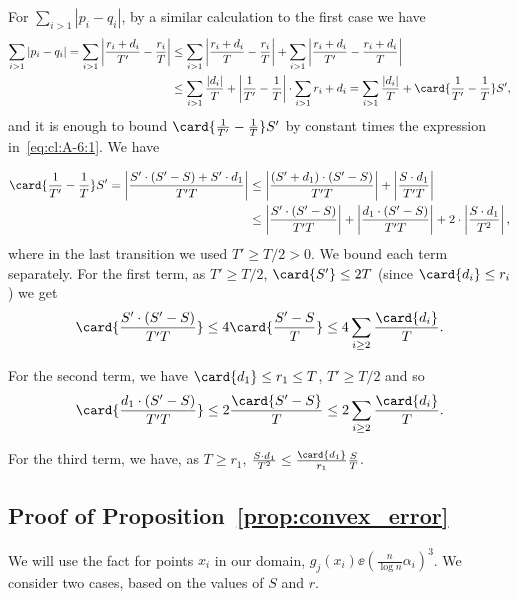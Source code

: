 	 For $\sum_{i>1} |p_i-q_i|$, by a similar calculation to the first case we have
	 \begin{align*}
	 \sum_{i>1}|p_i-q_i| =  \sum_{i>1} \left| \frac{r_i+d_i}{T'} - \frac{r_i}{T} \right|
     &\le
	 \sum_{i>1} \left| \frac{r_i+d_i}{T} - \frac{r_i}{T} \right| +
	 \sum_{i>1} \left| \frac{r_i+d_i}{T'} - \frac{r_i+d_i}{T} \right|\\
     &\leq
	 \sum_{i>1} \frac{|d_i|}{T}+\left|\frac{1}{T'}-\frac{1}{T}\right|\cdot
	 \sum_{i>1} r_i+d_i
     = \sum_{i>1} \frac{|d_i|}{T} + \card{\frac{1}{T'}-\frac{1}{T}} S',
     \end{align*}
     and it is enough to bound $\card{\frac{1}{T'}-\frac{1}{T}} S'$ by constant times the expression in~\eqref{eq:cl:A-6:1}.
     We have

  \begin{align*}
     \card{\frac{1}{T'}-\frac{1}{T}} S'=
	 \left|\frac{S'\cdot (S'-S) + S'\cdot d_1}{T'T}\right|
     &\leq
	 \left|\frac{(S'+d_1)\cdot (S'-S)}{T'T}\right|+
	 \left|\frac{ S\cdot d_1}{T'T}\right|\\
     &\leq
     \left|\frac{S'\cdot (S'-S)}{T'T}\right|
     +\left|\frac{d_1\cdot (S'-S)}{T'T}\right|
	 + 2\cdot
	 \left|\frac{ S\cdot d_1}{T^2}\right|,
	 \end{align*}
where in the last transition we used $T' \geq T/2 > 0$.
We bound each term separately.
For the first term, as $T'\geq T/2$, $\card{S'}\leq 2T$ (since $\card{d_i}\leq r_i$) we get
\[
\card{\frac{S'\cdot (S'-S)}{T'T}}
\leq 4\card{\frac{S'-S}{T}}
\leq 4\sum\limits_{i\geq 2}{\frac{\card{d_i}}{T}}.
\]

For the second term, we have $\card{d_1}\leq r_1\leq T$, $T'\geq T/2$ and so
\[
\card{\frac{d_1\cdot (S'-S)}{T'T}}
\leq 2\frac{\card{S'-S}}{T}
\leq 2\sum\limits_{i\geq 2}{\frac{\card{d_i}}{T}}.
\]

For the third term, we have, as $T\geq r_1$,
$\frac{ S\cdot d_1}{T^2}
\leq \frac{\card{d_1}}{r_1}\frac{S}{T}$.

\subsection{Proof of Proposition~\ref{prop:convex_error}}
	We will use the fact for points $x_i$ in our domain, $g_j(x_i) \ee \left(\frac{n}{\log n}\alpha_i\right)^3$.
	We consider two cases, based on the values of $S$ and $r$.
